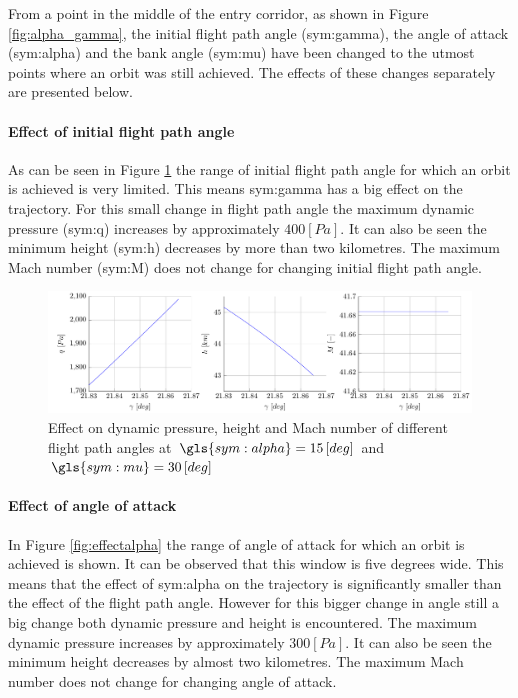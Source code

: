 From a point in the middle of the entry corridor, as shown in Figure \ref{fig:alpha_gamma}, the initial flight path angle (\gls{sym:gamma}), the angle of attack (\gls{sym:alpha}) and the bank angle (\gls{sym:mu}) have been changed to the utmost points where an orbit was still achieved. The effects of these changes separately are presented below.

\paragraph{Effect of initial flight path angle}
As can be seen in Figure \ref{fig:effectgamma} the range of initial flight path angle for which an orbit is achieved is very limited. This means \gls{sym:gamma} has a big effect on the trajectory. For this small change in flight path angle the maximum dynamic pressure (\gls{sym:q}) increases by approximately $400 \left[Pa\right]$. It can also be seen the minimum height (\gls{sym:h}) decreases by more than two kilometres. The maximum Mach number (\gls{sym:M}) does not change for changing initial flight path angle.

\begin{figure}[h]
	\centering
	\includegraphics[width=\textwidth]{./Figure/orbit/effectgamma.pdf}
	\caption[Effect on dynamic pressure, height and Mach number of different flight path angles]{Effect on dynamic pressure, height and Mach number of different flight path angles at $\gls{sym:alpha}=15 \left[deg\right]$ and $\gls{sym:mu}=30 \left[deg\right]$}
	\label{fig:effectgamma}
\end{figure}

\paragraph{Effect of angle of attack}

In Figure \ref{fig:effectalpha} the range of angle of attack for which an orbit is achieved is shown. It can be observed that this window is five degrees wide. This means that the effect of \gls{sym:alpha} on the trajectory is significantly smaller than the effect of the flight path angle. However for this bigger change in angle still a big change both dynamic pressure and height is encountered. The maximum dynamic pressure increases by approximately $300 \left[Pa\right]$. It can also be seen the minimum height decreases by almost two kilometres. The maximum Mach number does not change for changing angle of attack.

